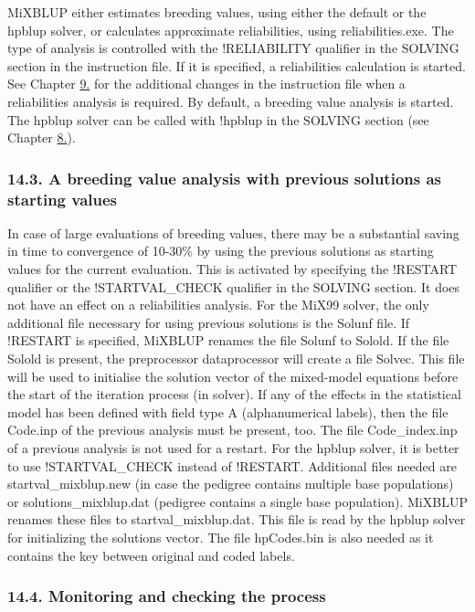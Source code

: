 MiXBLUP either estimates breeding values, using either the default or
the hpblup solver, or calculates approximate reliabilities, using
reliabilities.exe. The type of analysis is controlled with the
!RELIABILITY qualifier in the SOLVING section in the instruction file.
If it is specified, a reliabilities calculation is started. See Chapter
\hyperref[Reli01]{9.} for the additional changes in the instruction file
when a reliabilities analysis is required. By default, a breeding value
analysis is started. The hpblup solver can be called with !hpblup in the
SOLVING section (see Chapter \hyperref[Cont01]{8.}).

\subsubsection{14.3. A breeding value analysis with previous solutions
as starting values}\label{Runn04}

In case of large evaluations of breeding values, there may be a
substantial saving in time to convergence of 10-30\% by using the
previous solutions as starting values for the current evaluation. This
is activated by specifying the !RESTART qualifier or the
!STARTVAL\_CHECK qualifier in the SOLVING section. It does not have an
effect on a reliabilities analysis. For the MiX99 solver, the only
additional file necessary for using previous solutions is the Solunf
file. If !RESTART is specified, MiXBLUP renames the file Solunf to
Solold. If the file Solold is present, the preprocessor dataprocessor
will create a file Solvec. This file will be used to initialise the
solution vector of the mixed-model equations before the start of the
iteration process (in solver). If any of the effects in the statistical
model has been defined with field type A (alphanumerical labels), then
the file Code.inp of the previous analysis must be present, too. The
file Code\_index.inp of a previous analysis is not used for a restart.
For the hpblup solver, it is better to use !STARTVAL\_CHECK instead of
!RESTART. Additional files needed are startval\_mixblup.new (in case the
pedigree contains multiple base populations) or solutions\_mixblup.dat
(pedigree contains a single base population). MiXBLUP renames these
files to startval\_mixblup.dat. This file is read by the hpblup solver
for initializing the solutions vector. The file hpCodes.bin is also
needed as it contains the key between original and coded labels.

\subsubsection{14.4. Monitoring and checking the process}\label{Runn05}

